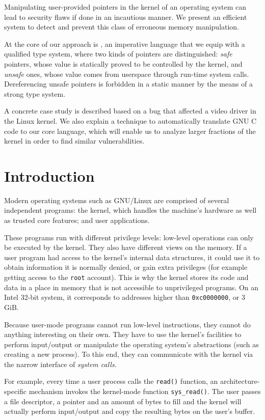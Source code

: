 Manipulating user-provided pointers in the kernel of an operating system can
lead to security flaws if done in an incautious manner. We present an efficient
system to detect and prevent this class of erroneous memory manipulation.

At the core of our approach is \langname, an imperative language that we equip
with a qualified type system, where two kinds of pointers are distinguished:
\emph{safe} pointers, whose value is statically proved to be controlled by the
kernel, and \emph{unsafe} ones, whose value comes from userspace through
run-time system calls. Dereferencing unsafe pointers is forbidden in a static
manner by the means of a strong type system.

A concrete case study is described based on a bug that affected a video driver
in the Linux kernel. We also explain a technique to automatically translate GNU
C code to our core language, which will enable us to analyze larger fractions of
the kernel in order to find similar vulnerabilities.

\section{Introduction}

Modern operating systems such as GNU/Linux are comprised of several independent
programs: the kernel, which handles the machine's hardware as well as trusted
core features; and user applications.

These programs run with different privilege levels: low-level operations can
only be executed by the kernel. They also have different views on the memory. If
a user program had access to the kernel's internal data structures, it could use
it to obtain information it is normally denied, or gain extra privileges (for
example getting access to the \texttt{root} account). This is why the kernel
stores its code and data in a place in memory that is not accessible to
unprivileged programs. On an Intel 32-bit system, it corresponds to addresses
higher than \texttt{0xc0000000}, or 3 GiB.

Because user-mode programs cannot run low-level instructions, they cannot do
anything interesting on their own. They have to use the kernel's facilities to
perform input/output or manipulate the operating system's abstractions (such as
creating a new process). To this end, they can communicate with the kernel
via the narrow interface of \emph{system calls}.

For example, every time a user process calls the \texttt{read()} function, an
architecture-specific mechanism invokes the kernel-mode function
\texttt{sys\_read()}. The user passes a file descriptor, a pointer and an amount
of bytes to fill and the kernel will actually perform input/output and copy the
resulting bytes on the user's buffer.

